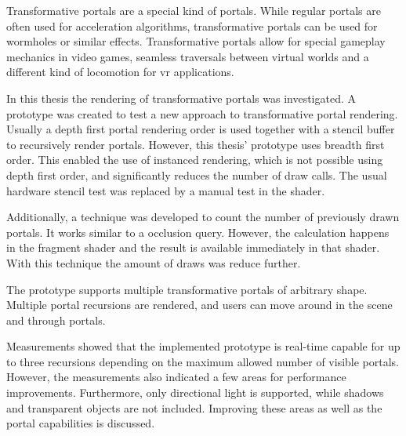
Transformative portals are a special kind of portals. While regular portals are often used for acceleration algorithms, transformative portals can be used for wormholes or similar effects. Transformative portals allow for special gameplay mechanics in video games, seamless traversals between virtual worlds and a different kind of locomotion for \gls{vr} applications.

In this thesis the rendering of transformative portals was investigated. A prototype was created to test a new approach to transformative portal rendering. Usually a depth first portal rendering order is used together with a stencil buffer to recursively render portals. However, this thesis' prototype uses breadth first order. This enabled the use of instanced rendering, which is not possible using depth first order, and significantly reduces the number of draw calls. The usual hardware stencil test was replaced by a manual test in the shader.

Additionally, a technique was developed to count the number of previously drawn portals. It works similar to a occlusion query. However, the calculation happens in the fragment shader and the result is available immediately in that shader. With this technique the amount of draws was reduce further.

The prototype supports multiple transformative portals of arbitrary shape. Multiple portal recursions are rendered, and users can move around in the scene and through portals.

Measurements showed that the implemented prototype is real-time capable for up to three recursions depending on the maximum allowed number of visible portals. However, the measurements also indicated a few areas for performance improvements. Furthermore, only directional light is supported, while shadows and transparent objects are not included. Improving these areas as well as the portal capabilities is discussed.
